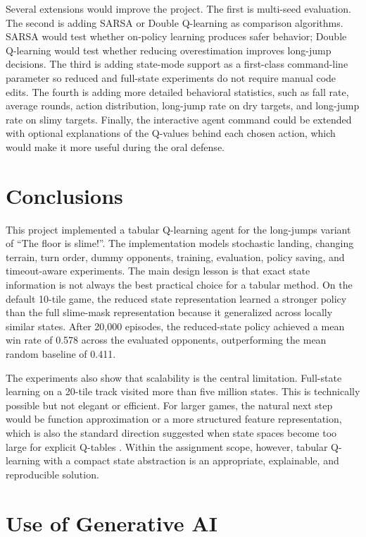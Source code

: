 \documentclass[conference]{IEEEtran}
\begin{document}
Several extensions would improve the project. The first is multi-seed evaluation.
The second is adding SARSA or Double Q-learning as comparison algorithms. SARSA
would test whether on-policy learning produces safer behavior; Double Q-learning
would test whether reducing overestimation improves long-jump decisions. The third
is adding state-mode support as a first-class command-line parameter so reduced
and full-state experiments do not require manual code edits. The fourth is adding
more detailed behavioral statistics, such as fall rate, average rounds, action
distribution, long-jump rate on dry targets, and long-jump rate on slimy targets.
Finally, the interactive agent command could be extended with optional explanations
of the Q-values behind each chosen action, which would make it more useful during
the oral defense.

\section{Conclusions}

This project implemented a tabular Q-learning agent for the long-jumps variant of
``The floor is slime!''. The implementation models stochastic landing, changing
terrain, turn order, dummy opponents, training, evaluation, policy saving, and
timeout-aware experiments. The main design lesson is that exact state information
is not always the best practical choice for a tabular method. On the default
10-tile game, the reduced state representation learned a stronger policy than the
full slime-mask representation because it generalized across locally similar
states. After 20,000 episodes, the reduced-state policy achieved a mean win rate
of 0.578 across the evaluated opponents, outperforming the mean random baseline of
0.411.

The experiments also show that scalability is the central limitation. Full-state
learning on a 20-tile track visited more than five million states. This is
technically possible but not elegant or efficient. For larger games, the natural
next step would be function approximation or a more structured feature
representation, which is also the standard direction suggested when state spaces
become too large for explicit Q-tables \cite{sanchoQLearning}. Within the
assignment scope, however, tabular Q-learning with a compact state abstraction is
an appropriate, explainable, and reproducible solution.

\section*{Use of Generative AI}
\end{document}
